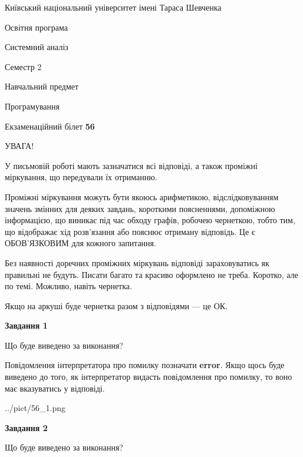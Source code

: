 \documentclass[12pt, ukrainian]{article}
\begin{document}
{{\begin {small}\par
{ \center  Київський національний університет імені Тараса Шевченка \par}
{\parbox {5 cm}{Освітня програма \hfill}{\parbox {7 cm}{Системний аналіз \hfill}}\parbox {6 cm}{\hfill Семестр 2}}\par
{\parbox {5 cm} {Навчальний предмет \hfill}\parbox {7 cm}{Програмування \hfill}\parbox {6cm}{\hfill}\par}\vspace{-7pt} \end{small}}{\center Екзаменаційний білет \No \textbf
{ 56 }\par}}
{
\begin {large}
УВАГА!

У письмовій роботі мають зазначатися всі відповіді, а також проміжні міркування, що передували їх отриманню.

Проміжні міркування можуть бути якоюсь арифметикою, відслідковуванням зна\-чень змінних для деяких завдань,
короткими поясненнями, допоміжною інформацією, що виникає під час обходу графів, робочею чернеткою,
тобто тим, що відображає хід розв’язання або пояснює отриману відповідь.
Це є ОБОВ’ЯЗКОВИМ для кожного запитання.

Без наявності доречних проміжних міркувань відповіді зараховуватись як правиль\-ні не будуть.
Писати багато та красиво оформлено не треба. Коротко, але по темі. Можли\-во, навіть чернетка.

Якщо на аркуші буде чернетка разом з відповідями --- це ОК.

\newpage

{\begin {center}\textbf{Завдання 1}\end {center}}\par
Що буде виведено за виконання?

Повідомлення інтерпретатора про помилку позначати \textbf{error}.
Якщо щось буде виведено до того, як інтерпретатор видасть повідомлення про помилку, 
то воно має вказуватись у відповіді. \par


\begin{center}
	{../pict/56_1.png}
\end{center}
\newpage

{\begin {center}\textbf{Завдання 2}\end {center}}\par
Що буде виведено за виконання?


\end{large}}
\end{document}
